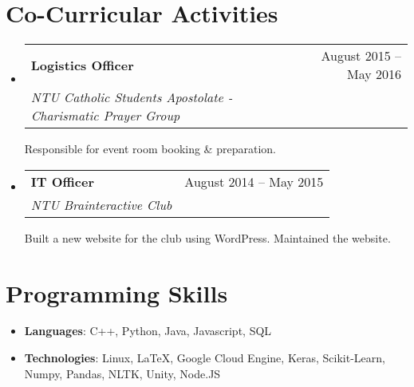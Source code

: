 \documentclass[letterpaper]{article}
\makeatletter
\newcommand{\resumeSubheading}[4]{
  \vspace{-1pt}\item
    \begin{tabular*}{0.97\textwidth}{l@{\extracolsep{\fill}}r}
      \textbf{#1} & #2 \\
      \textit{\small#3} & \textit{\small #4} \\
    \end{tabular*}\vspace{-5pt}
}
\newcommand{\resumeSubHeadingListStart}{\begin{itemize}[leftmargin=*]}
\newcommand{\resumeSubHeadingListEnd}{\end{itemize}}
\makeatother
\begin{document}
\section{Co-Curricular Activities}
\resumeSubHeadingListStart
    \resumeSubheading
      {Logistics Officer}{August 2015 -- May 2016}
      {NTU Catholic Students Apostolate - Charismatic Prayer Group}{}
        \begin{outline}
         \1 Responsible for event room booking \& preparation.
        \end{outline}
    \resumeSubheading
      {IT Officer}{August 2014 -- May 2015}
      {NTU Brainteractive Club}{}
        \begin{outline}
         \vspace{-4pt}
         \1 Built a new website for the club using WordPress.
         \vspace{-4pt}
         \1 Maintained the website.
         \vspace{-4pt}
        \end{outline}
\resumeSubHeadingListEnd

\section{Programming Skills}
  \resumeSubHeadingListStart
    \item{
      \textbf{Languages}{: C++, Python, Java, Javascript, SQL}\\
    }
    \item{
    \textbf{Technologies}{: Linux, LaTeX, Google Cloud Engine, Keras, Scikit-Learn, Numpy, Pandas, NLTK, Unity, Node.JS}
    }
  \resumeSubHeadingListEnd


\end{document}
